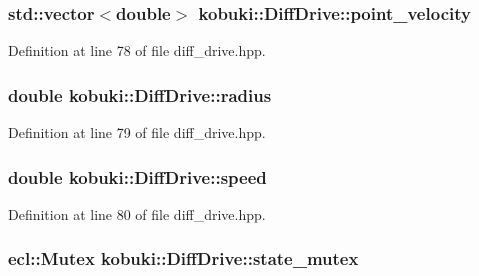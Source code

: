 \subsubsection[{point\-\_\-velocity}]{\setlength{\rightskip}{0pt plus 5cm}std\-::vector$<$double$>$ {\bf kobuki\-::\-Diff\-Drive\-::point\-\_\-velocity}\hspace{0.3cm}{\ttfamily  [private]}}\label{classkobuki_1_1DiffDrive_ac02cea6f6f4e072326be6df76b5b3adb}


\-Definition at line 78 of file diff\-\_\-drive.\-hpp.

\subsubsection[{radius}]{\setlength{\rightskip}{0pt plus 5cm}double {\bf kobuki\-::\-Diff\-Drive\-::radius}\hspace{0.3cm}{\ttfamily  [private]}}\label{classkobuki_1_1DiffDrive_ad2507b8a204c5e8e02c25f40c1787eff}


\-Definition at line 79 of file diff\-\_\-drive.\-hpp.

\subsubsection[{speed}]{\setlength{\rightskip}{0pt plus 5cm}double {\bf kobuki\-::\-Diff\-Drive\-::speed}\hspace{0.3cm}{\ttfamily  [private]}}\label{classkobuki_1_1DiffDrive_ab035b44a28ff971feb1e8806c8ccca59}


\-Definition at line 80 of file diff\-\_\-drive.\-hpp.

\subsubsection[{state\-\_\-mutex}]{\setlength{\rightskip}{0pt plus 5cm}ecl\-::\-Mutex {\bf kobuki\-::\-Diff\-Drive\-::state\-\_\-mutex}\hspace{0.3cm}{\ttfamily  [private]}}\label{classkobuki_1_1DiffDrive_a986e84bef0c53fb84096b2c36594f05e}


